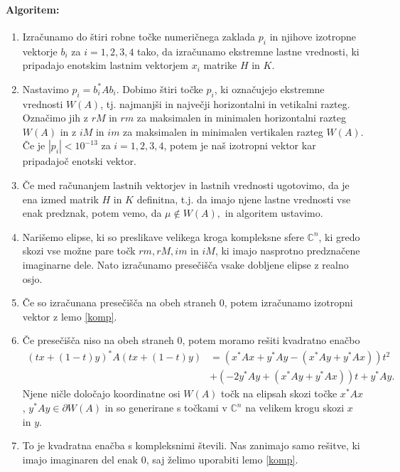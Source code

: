 \documentclass[12pt,a4paper]{amsart}
\theoremstyle{definition}
\theoremstyle{plain}
\newcommand{\C}{\mathbb C}
\begin{document}
\paragraph{Algoritem:}
\begin{enumerate}[1.]
\item Izračunamo do štiri robne točke numeričnega zaklada $p_i$ in njihove izotropne vektorje $b_i$ za $i=1,2,3,4$ tako, da izračunamo ekstremne lastne vrednosti, ki pripadajo enotskim lastnim vektorjem $x_i$ %
matrike $H$ in $K$.
\item Nastavimo $p_i =b^\ast _i Ab_i$. Dobimo štiri točke $p_i$, ki označujejo ekstremne vrednosti $W(A)$, tj. najmanjši in največji horizontalni in vetikalni razteg. Označimo jih z $rM$ in $rm$ za maksimalen in minimalen horizontalni razteg $W(A)$ in z $iM$ in $im$ za maksimalen in minimalen vertikalen razteg $W(A)$. Če je $|p_i|<10^{-13}$ za $i=1,2,3,4$, potem je naš izotropni vektor kar pripadajoč enotski vektor.
\item Če med računanjem lastnih vektorjev in lastnih vrednosti ugotovimo, da je ena izmed matrik $H$ in $K$ definitna, t.j. da imajo njene lastne vrednosti vse enak predznak, potem vemo, da $\mu \not\in W(A),$ in algoritem ustavimo.
\item Narišemo elipse, ki so preslikave velikega kroga kompleksne sfere $\C^n$, ki gredo skozi vse možne pare točk $rm, rM, im$ in $iM$, ki imajo nasprotno predznačene imaginarne dele. Nato izračunamo presečišča vsake dobljene elipse z realno osjo.%
\item Če so izračunana presečišča na obeh straneh 0, potem izračunamo izotropni vektor z lemo \ref{komp}.
\item Če presečišča niso na obeh straneh 0, potem moramo rešiti kvadratno enačbo 
\begin{align}\label{eq:en3}
(tx +(1-t)y)^\ast A(tx+(1-t)y) & =(x^\ast Ax+y^\ast Ay -(x^\ast Ay +y^\ast Ax))t^2 \\
&+(-2y^\ast Ay +(x^\ast Ay+y^\ast Ax))t +y^\ast Ay.\nonumber
\end{align}
Njene ničle določajo koordinatne osi $W(A)$ točk na elipsah skozi točke $x^\ast Ax$, $y^\ast Ay\in \partial W(A)$ %
in so generirane s točkami v $\C^n$ na velikem krogu skozi $x$ in $y$. 
\item To je kvadratna enačba s kompleksnimi števili. Nas zanimajo samo rešitve, ki imajo imaginaren del enak 0, saj želimo uporabiti lemo \ref{komp}.

\end{enumerate}
\end{document}
